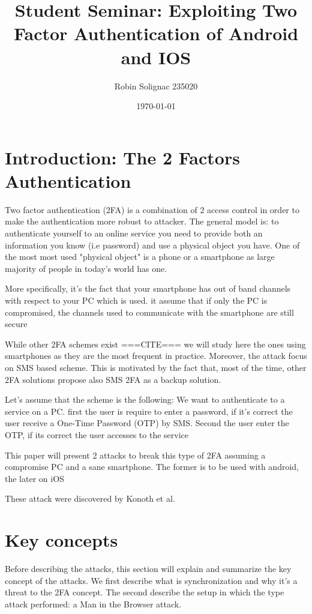 \documentclass[11pt, a4paper,twocolumn]{article}
\title{Student Seminar: Exploiting Two Factor Authentication of Android and IOS}
\author{Robin Solignac 235020}
\date{\today}
\begin{document}
\maketitle

\section{Introduction: The 2 Factors Authentication}

Two factor authentication (2FA) is a combination of 2 access control  in order to make the authentication more robust to attacker. The general model is: to authenticate yourself to an online service you need to provide both an information you know (i.e password) and use a physical object you have. 
One of the most most used "physical object" is a phone or a smartphone as large majority of people in today's world has one.

More specifically, it's the fact that your smartphone has out of band channels with respect to your PC which is used. it assume that if only the PC is compromised, the channels used to communicate with the smartphone are still secure

While other 2FA schemes exist ===CITE=== we will study here the ones using smartphones as they are the most frequent in practice. Moreover, the attack focus on SMS based scheme.
This is motivated by the fact that, most of the time, other 2FA solutions  propose also SMS 2FA as a backup solution.

Let's assume that the scheme is the following: We want to authenticate to a service on a PC. first the user is require to enter a password, if it's correct the user receive a One-Time Password (OTP) by SMS. Second the user enter the OTP, if its correct the user accesses to the service

This paper will present 2 attacks to break this type of 2FA assuming a compromise PC and a sane smartphone. The former is to be used with android, the later on iOS

These attack were discovered by Konoth et al. \cite{Base}

\section{Key concepts}
Before describing the attacks, this section will explain and summarize the key concept of the attacks. We first describe what is synchronization and why it's a threat to the 2FA concept. The second describe the setup in which the type attack performed: a Man in the Browser attack.
\end{document}
